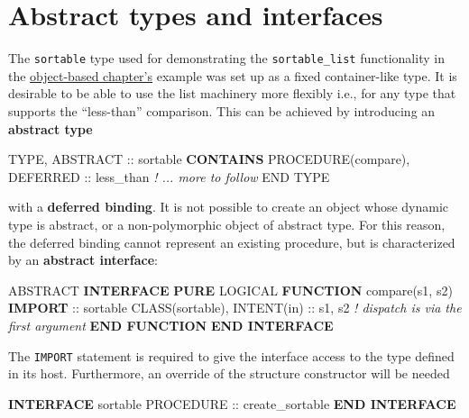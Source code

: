 \documentclass[
]{article}
\newenvironment{Shaded}{}{}
\newcommand{\CommentTok}[1]{\textcolor[rgb]{0.38,0.63,0.69}{\textit{#1}}}
\newcommand{\DataTypeTok}[1]{\textcolor[rgb]{0.56,0.13,0.00}{#1}}
\newcommand{\KeywordTok}[1]{\textcolor[rgb]{0.00,0.44,0.13}{\textbf{#1}}}
\newcommand{\NormalTok}[1]{#1}
\begin{document}
\section{Abstract types and
interfaces}\label{abstract-types-and-interfaces}

The \texttt{sortable} type used for demonstrating the
\texttt{sortable\_list} functionality in the
\hyperref[sec:oop_techniques]{object-based chapter's} example was set up
as a fixed container-like type. It is desirable to be able to use the
list machinery more flexibly i.e., for any type that supports the
``less-than'' comparison. This can be achieved by introducing an
\textbf{abstract type}

\begin{Shaded}
\begin{Highlighting}[]
\DataTypeTok{TYPE}\NormalTok{, }\DataTypeTok{ABSTRACT} \DataTypeTok{::}\NormalTok{ sortable}
\KeywordTok{CONTAINS}
   \DataTypeTok{PROCEDURE(compare)}\NormalTok{, }\DataTypeTok{DEFERRED} \DataTypeTok{::}\NormalTok{ less\_than}
   \CommentTok{! ... more to follow}
\DataTypeTok{END TYPE}
\end{Highlighting}
\end{Shaded}

with a \textbf{deferred binding}. It is not possible to create an object
whose dynamic type is abstract, or a non-polymorphic object of abstract
type. For this reason, the deferred binding cannot represent an existing
procedure, but is characterized by an \textbf{abstract interface}:

\begin{Shaded}
\begin{Highlighting}[]
\DataTypeTok{ABSTRACT} \KeywordTok{INTERFACE}
   \KeywordTok{PURE} \DataTypeTok{LOGICAL} \KeywordTok{FUNCTION}\NormalTok{ compare(s1, s2)}
      \KeywordTok{IMPORT} \DataTypeTok{::}\NormalTok{ sortable}
      \DataTypeTok{CLASS(sortable)}\NormalTok{, }\DataTypeTok{INTENT(in)} \DataTypeTok{::}\NormalTok{ s1, s2}
      \CommentTok{! dispatch is via the first argument}
   \KeywordTok{END FUNCTION}
\KeywordTok{END INTERFACE}
\end{Highlighting}
\end{Shaded}

The \texttt{IMPORT} statement is required to give the interface access
to the type defined in its host. Furthermore, an override of the
structure constructor will be needed

\begin{Shaded}
\begin{Highlighting}[]
\KeywordTok{INTERFACE}\NormalTok{ sortable}
   \DataTypeTok{PROCEDURE} \DataTypeTok{::}\NormalTok{ create\_sortable}
\KeywordTok{END INTERFACE}
\end{Highlighting}
\end{Shaded}
\end{document}
